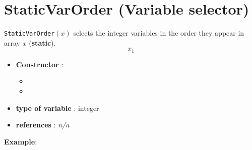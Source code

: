 \section{StaticVarOrder (Variable selector)}\label{staticvarorder:staticvarordervarselector}\hypertarget{staticvarorder:staticvarordervarselector}{}
\begin{notedef}
  \texttt{StaticVarOrder}$(x)$ selects the integer variables in the order they appear in array $x$ (\textbf{static}).
$$x_1$$
\end{notedef}

\begin{itemize}
	\item \textbf{Constructor} : 
	\begin{itemize}
	\item {}
	\item {}
	\end{itemize}	
	\item \textbf{type of variable} : integer
	\item \textbf{references} : \emph{n/a}
\end{itemize}

\textbf{Example}:
%

